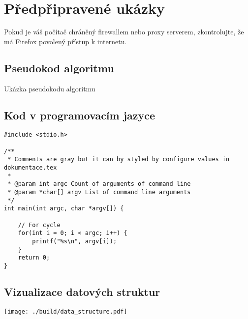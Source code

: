 \section{Předpřipravené ukázky}

Pokud je váš počítač chráněný firewallem nebo proxy serverem, zkontrolujte, že má Firefox povolený přístup k internetu.

\subsection{Pseudokod algoritmu}

\begin{algorithm}[h]
\caption{Ukázka pseudokodu algoritmu}
\end{algorithm}

\subsection{Kod v programovacím jazyce}

\begin{lstlisting}[caption = Print arguments of command line]
#include <stdio.h>

/**
 * Comments are gray but it can by styled by configure values in dokumentace.tex
 *
 * @param int argc Count of arguments of command line
 * @param *char[] argv List of command line arguments
 */
int main(int argc, char *argv[]) {
	
	// For cycle
    for(int i = 0; i < argc; i++) {
    	printf("%s\n", argv[i]);
    }
    return 0;
}
\end{lstlisting}
\subsection{Vizualizace datových struktur}
\texttt{[image: ./build/data\_structure.pdf]}